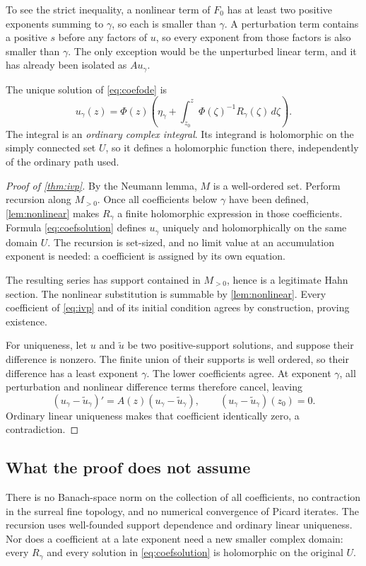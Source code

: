 \documentclass[11pt,letterpaper]{article}
\numberwithin{equation}{section}
\theoremstyle{definition}
\theoremstyle{remark}
\begin{document}
To see the strict inequality, a nonlinear term of $F_0$ has at least two positive exponents summing to $\gamma$, so each is smaller than $\gamma$. A perturbation term contains a positive $s$ before any factors of $u$, so every exponent from those factors is also smaller than $\gamma$. The only exception would be the unperturbed linear term, and it has already been isolated as $Au_\gamma$.

The unique solution of \eqref{eq:coefode} is
\begin{equation}\label{eq:coefsolution}
 u_\gamma(z)=\Phi(z)
 \left(\eta_\gamma+
 \int_{z_0}^{z}\Phi(\zeta)^{-1}R_\gamma(\zeta)\,d\zeta\right).
\end{equation}
The integral is an \emph{ordinary complex integral}. Its integrand is holomorphic on the simply connected set $U$, so it defines a holomorphic function there, independently of the ordinary path used.

\begin{proof}[Proof of \cref{thm:ivp}]
By the Neumann lemma, $M$ is a well-ordered set. Perform recursion along $M_{>0}$. Once all coefficients below $\gamma$ have been defined, \cref{lem:nonlinear} makes $R_\gamma$ a finite holomorphic expression in those coefficients. Formula \eqref{eq:coefsolution} defines $u_\gamma$ uniquely and holomorphically on the same domain $U$. The recursion is set-sized, and no limit value at an accumulation exponent is needed: a coefficient is assigned by its own equation.

The resulting series has support contained in $M_{>0}$, hence is a legitimate Hahn section. The nonlinear substitution is summable by \cref{lem:nonlinear}. Every coefficient of \eqref{eq:ivp} and of its initial condition agrees by construction, proving existence.

For uniqueness, let $u$ and $\widetilde u$ be two positive-support solutions, and suppose their difference is nonzero. The finite union of their supports is well ordered, so their difference has a least exponent $\gamma$. The lower coefficients agree. At exponent $\gamma$, all perturbation and nonlinear difference terms therefore cancel, leaving
\[
 (u_\gamma-\widetilde u_\gamma)'=A(z)(u_\gamma-\widetilde u_\gamma),
 \qquad (u_\gamma-\widetilde u_\gamma)(z_0)=0.
\]
Ordinary linear uniqueness makes that coefficient identically zero, a contradiction.
\end{proof}

\subsection{What the proof does not assume}
There is no Banach-space norm on the collection of all coefficients, no contraction in the surreal fine topology, and no numerical convergence of Picard iterates. The recursion uses well-founded support dependence and ordinary linear uniqueness. Nor does a coefficient at a late exponent need a new smaller complex domain: every $R_\gamma$ and every solution in \eqref{eq:coefsolution} is holomorphic on the original $U$.
\end{document}

